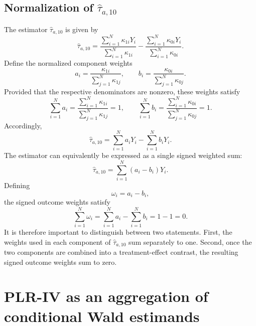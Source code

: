 \documentclass[12pt, a4paper, oneside]{article}
\theoremstyle{plain}
\theoremstyle{definition}
\begin{document}
\subsection{Normalization of \texorpdfstring{$\widehat{\tau}_{a,10}$}{tau-a10}}
The estimator $\widehat{\tau}_{a,10}$ is given by
\begin{equation}
\widehat{\tau}_{a,10}
=
\frac{\sum_{i=1}^N\kappa_{1i}Y_i}
{\sum_{i=1}^N\kappa_{1i}}
-
\frac{\sum_{i=1}^N\kappa_{0i}Y_i}
{\sum_{i=1}^N\kappa_{0i}}.
\end{equation}
Define the normalized component weights
\begin{equation}
a_i
=
\frac{\kappa_{1i}}
{\sum_{j=1}^N\kappa_{1j}},
\qquad
b_i
=
\frac{\kappa_{0i}}
{\sum_{j=1}^N\kappa_{0j}}.
\label{eq:kappa_normalized_weights}
\end{equation}
Provided that the respective denominators are nonzero, these weights satisfy
\begin{equation}
\sum_{i=1}^N a_i
=
\frac{\sum_{i=1}^N\kappa_{1i}}
{\sum_{j=1}^N\kappa_{1j}}
=1,
\qquad
\sum_{i=1}^N b_i
=
\frac{\sum_{i=1}^N\kappa_{0i}}
{\sum_{j=1}^N\kappa_{0j}}
=1.
\end{equation}
Accordingly,
\begin{equation}
\widehat{\tau}_{a,10}
=
\sum_{i=1}^N a_iY_i
-
\sum_{i=1}^N b_iY_i.
\label{eq:tau_a10_weighted_means}
\end{equation}
The estimator can equivalently be expressed as a single signed weighted sum:
\begin{equation}
\widehat{\tau}_{a,10}
=
\sum_{i=1}^N(a_i-b_i)Y_i.
\end{equation}
Defining
\begin{equation}
\omega_i=a_i-b_i,
\end{equation}
the signed outcome weights satisfy
\begin{equation}
\sum_{i=1}^N\omega_i
=
\sum_{i=1}^N a_i
-
\sum_{i=1}^N b_i
=
1-1=0.
\label{eq:tau_a10_zero_sum}
\end{equation}
It is therefore important to distinguish between two statements. First, the weights used in each component of $\widehat{\tau}_{a,10}$ sum separately to one. Second, once the two components are combined into a treatment-effect contrast, the resulting signed outcome weights sum to zero. 

\section{PLR-IV as an aggregation of conditional Wald estimands}
\label{app:pliv_late_aggregation}
\end{document}
